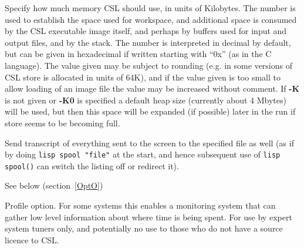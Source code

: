 \vspace{2mm} 
\vspace{1mm}

\hspace*{.25in}\parbox{4.5in}{
Specify how much memory CSL should use, in units of Kilobytes.
The number is used to establish the space used for workspace,
and additional space is consumed by the CSL executable image
itself, and perhaps by buffers used for input and output
files, and by the stack.  The number is interpreted in decimal
by default, but can be given in hexadecimal if written
starting with ``0x'' (as in the C language).  The value given
may be subject to rounding (e.g. in some versions of CSL store
is allocated in units of 64K), and if the value given is too
small to allow loading of an image file the value may be
increased without comment.  If {\bf -K} is not given or {\bf -K0} is
specified a default heap size (currently about 4 Mbytes)
will be used, but then this space will be expanded (if
possible) later in the run if store seems to be becoming
full.}

\vspace{2mm}
\vspace{1mm}

\hspace*{.25in}\parbox{4.5in}{
Send transcript of everything sent to the screen to the specified file
as well (as if by doing {\tt lisp spool "file"} at the start, and
hence subsequent use of {\tt lisp spool()} can switch the listing off
or redirect it).}

\vspace{2mm} 
\vspace{1mm}

\hspace*{.25in}\parbox{4.5in}{See below (section~\ref{OptO})}

\vspace{2mm} 
\vspace{1mm}

\hspace*{.25in}\parbox{4.5in}{
Profile option.  For some systems this enables a monitoring
system that can gather low level information about where time
is being spent.  For use by expert system tuners only, and
potentially no use to those who do not have a source licence
to CSL.}

\vspace{2mm} 
\vspace{1mm}

